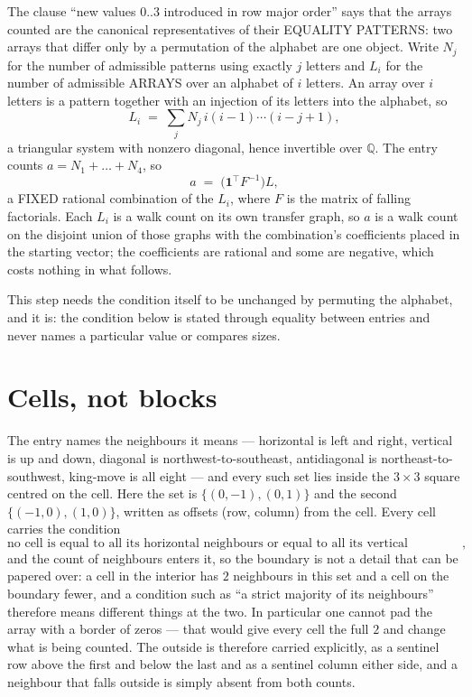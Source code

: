 \documentclass[11pt,a4paper]{article}
\theoremstyle{plain}
\theoremstyle{definition}
\begin{document}
The clause ``new values $0..3$ introduced in row major order'' says that the arrays
counted are the canonical representatives of their EQUALITY PATTERNS: two arrays that differ
only by a permutation of the alphabet are one object. Write $N_j$ for the number of admissible
patterns using exactly $j$ letters and $L_i$ for the number of admissible ARRAYS over an
alphabet of $i$ letters. An array over $i$ letters is a pattern together with an injection of
its letters into the alphabet, so
\[
L_i\;=\;\sum_{j}N_j\,i(i-1)\cdots(i-j+1),
\]
a triangular system with nonzero diagonal, hence invertible over $\mathbb{Q}$. The entry
counts $a=N_1+\dots+N_{4}$, so
\[
a\;=\;\bigl(\mathbf{1}^{\!\top}F^{-1}\bigr)L ,
\]
a FIXED rational combination of the $L_i$, where $F$ is the matrix of falling factorials.
Each $L_i$ is a walk count on its own transfer graph, so $a$ is a walk count on the disjoint
union of those graphs with the combination's coefficients placed in the starting vector; the
coefficients are rational and some are negative, which costs nothing in what follows.

This step needs the condition itself to be unchanged by permuting the alphabet, and it is:
the condition below is stated through equality between entries and never names a particular
value or compares sizes.

\section{Cells, not blocks}

The entry names the neighbours it means --- horizontal is left and right, vertical is up and
down, diagonal is northwest-to-southeast, antidiagonal is northeast-to-southwest, king-move is
all eight --- and every such set lies inside the $3\times3$ square centred on the cell. Here
the set is $\{(0,-1), (0,1)\}$ and the second $\{(-1,0), (1,0)\}$, written as offsets (row, column) from the cell. Every cell carries
the condition
\[
\text{no cell is equal to all its horizontal neighbours or equal to all its vertical neighbours},
\]
and the count of neighbours enters it, so the boundary is not a detail that can be papered
over: a cell in the interior has $2$ neighbours in this set and a cell on the boundary
fewer, and a condition such as ``a strict majority of its neighbours'' therefore means
different things at the two. In particular one cannot pad the array with a border of zeros ---
that would give every cell the full $2$ and change what is being counted. The outside is
therefore carried
explicitly, as a sentinel row above the first and below the last and as a sentinel column
either side, and a neighbour that falls outside is simply absent from both counts.
\end{document}

